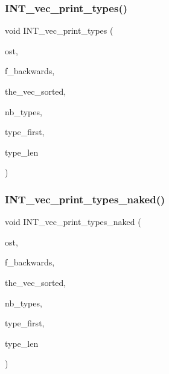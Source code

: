 \subsubsection{\texorpdfstring{I\+N\+T\+\_\+vec\+\_\+print\+\_\+types()}{INT\_vec\_print\_types()}}
{\footnotesize\ttfamily void I\+N\+T\+\_\+vec\+\_\+print\+\_\+types (\begin{DoxyParamCaption}\item[{ostream \&}]{ost,  }\item[{\mbox{\hyperlink{galois_8h_a09fddde158a3a20bd2dcadb609de11dc}{I\+NT}}}]{f\+\_\+backwards,  }\item[{\mbox{\hyperlink{galois_8h_a09fddde158a3a20bd2dcadb609de11dc}{I\+NT}} $\ast$}]{the\+\_\+vec\+\_\+sorted,  }\item[{\mbox{\hyperlink{galois_8h_a09fddde158a3a20bd2dcadb609de11dc}{I\+NT}}}]{nb\+\_\+types,  }\item[{\mbox{\hyperlink{galois_8h_a09fddde158a3a20bd2dcadb609de11dc}{I\+NT}} $\ast$}]{type\+\_\+first,  }\item[{\mbox{\hyperlink{galois_8h_a09fddde158a3a20bd2dcadb609de11dc}{I\+NT}} $\ast$}]{type\+\_\+len }\end{DoxyParamCaption})}

\mbox{\label{sorting_8_c_a912803fbc27f21eb925239bd9e2646c5}} 
\subsubsection{\texorpdfstring{I\+N\+T\+\_\+vec\+\_\+print\+\_\+types\+\_\+naked()}{INT\_vec\_print\_types\_naked()}}
{\footnotesize\ttfamily void I\+N\+T\+\_\+vec\+\_\+print\+\_\+types\+\_\+naked (\begin{DoxyParamCaption}\item[{ostream \&}]{ost,  }\item[{\mbox{\hyperlink{galois_8h_a09fddde158a3a20bd2dcadb609de11dc}{I\+NT}}}]{f\+\_\+backwards,  }\item[{\mbox{\hyperlink{galois_8h_a09fddde158a3a20bd2dcadb609de11dc}{I\+NT}} $\ast$}]{the\+\_\+vec\+\_\+sorted,  }\item[{\mbox{\hyperlink{galois_8h_a09fddde158a3a20bd2dcadb609de11dc}{I\+NT}}}]{nb\+\_\+types,  }\item[{\mbox{\hyperlink{galois_8h_a09fddde158a3a20bd2dcadb609de11dc}{I\+NT}} $\ast$}]{type\+\_\+first,  }\item[{\mbox{\hyperlink{galois_8h_a09fddde158a3a20bd2dcadb609de11dc}{I\+NT}} $\ast$}]{type\+\_\+len }\end{DoxyParamCaption})}

